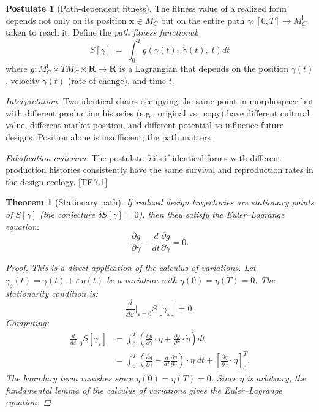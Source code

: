 \documentclass[10pt]{article}
\theoremstyle{definition}
\newtheorem{postulate}[definition]{Postulate}
\theoremstyle{plain}
\newtheorem{theorem}[definition]{Theorem}
\theoremstyle{remark}
\newcommand{\MC}{M^{\mathsf{I}}_C}          %
\providecommand{\R}{}
\renewcommand{\R}{\mathbf{R}}               %
\newcommand{\TF}[1]{\textnormal{[TF\,#1]}}  %
\begin{document}
\begin{postulate}[Path-dependent fitness]\label{post:9.1}
The fitness value of a realized form depends not only on its position
$\bm{x} \in \MC$ but on the entire path $\gamma : [0, T] \to \MC$
taken to reach it. Define the \emph{path fitness functional}:
\[
  S[\gamma] \;=\; \int_0^T
    g\!\left(\gamma(t),\; \dot{\gamma}(t),\; t\right) dt
\]
where $g : \MC \times T\MC \times \R \to \R$ is a Lagrangian that
depends on the position $\gamma(t)$, velocity $\dot{\gamma}(t)$
(rate of change), and time $t$.

\medskip\noindent
\textit{Interpretation.}\;
Two identical chairs occupying the same point in morphospace but with
different production histories (e.g., original vs.\ copy) have
different cultural value, different market position, and different
potential to influence future designs. Position alone is insufficient;
the path matters.

\medskip\noindent
\textit{Falsification criterion.}\;
The postulate fails if identical forms with different production
histories consistently have the same survival and reproduction rates
in the design ecology. \TF{7.1}
\end{postulate}

\begin{theorem}[Stationary path]\label{thm:9.2}
If realized design trajectories are stationary points of $S[\gamma]$
(the conjecture $\delta S[\gamma] = 0$), then they satisfy the
Euler--Lagrange equation:
\[
  \frac{\partial g}{\partial \gamma}
  - \frac{d}{dt}\frac{\partial g}{\partial \dot{\gamma}} = 0.
\]

\begin{proof}
This is a direct application of the calculus of variations. Let
$\gamma_\varepsilon(t) = \gamma(t) + \varepsilon \, \eta(t)$ be a
variation with $\eta(0) = \eta(T) = 0$. The stationarity condition is:
\[
  \frac{d}{d\varepsilon}\bigg|_{\varepsilon=0} S[\gamma_\varepsilon]
  = 0.
\]
Computing:
\begin{align*}
  \frac{d}{d\varepsilon}\bigg|_{0} S[\gamma_\varepsilon]
  &= \int_0^T \left(
    \frac{\partial g}{\partial \gamma} \cdot \eta
    + \frac{\partial g}{\partial \dot{\gamma}} \cdot \dot{\eta}
  \right) dt \\
  &= \int_0^T \left(
    \frac{\partial g}{\partial \gamma}
    - \frac{d}{dt}\frac{\partial g}{\partial \dot{\gamma}}
  \right) \cdot \eta \; dt
  + \left[\frac{\partial g}{\partial \dot{\gamma}} \cdot \eta
  \right]_0^T.
\end{align*}
The boundary term vanishes since $\eta(0) = \eta(T) = 0$. Since $\eta$
is arbitrary, the fundamental lemma of the calculus of variations
gives the Euler--Lagrange equation. \qedhere
\end{proof}
\end{theorem}
\end{document}
